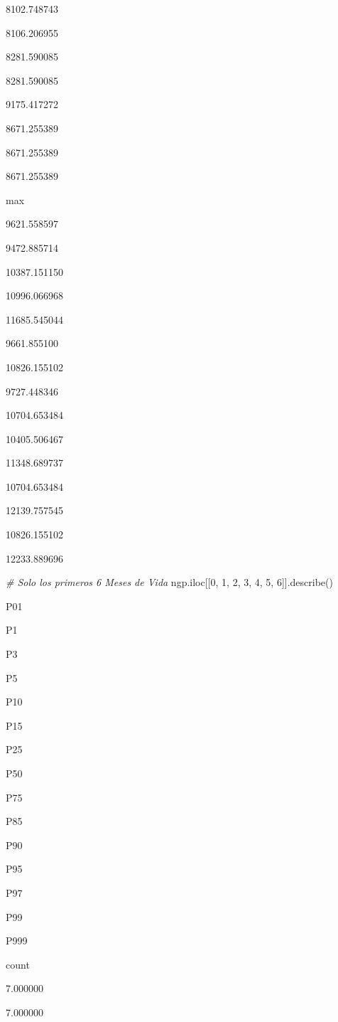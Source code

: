 \documentclass[
]{article}
\newenvironment{Shaded}{\begin{snugshade}}{\end{snugshade}}
\newcommand{\CommentTok}[1]{\textcolor[rgb]{0.56,0.35,0.01}{\textit{#1}}}
\newcommand{\DecValTok}[1]{\textcolor[rgb]{0.00,0.00,0.81}{#1}}
\newcommand{\NormalTok}[1]{#1}
\begin{document}
8102.748743

8106.206955

8281.590085

8281.590085

9175.417272

8671.255389

8671.255389

8671.255389

max

9621.558597

9472.885714

10387.151150

10996.066968

11685.545044

9661.855100

10826.155102

9727.448346

10704.653484

10405.506467

11348.689737

10704.653484

12139.757545

10826.155102

12233.889696

\begin{Shaded}
\begin{Highlighting}[]
\CommentTok{\# Solo los primeros 6 Meses de Vida}
\NormalTok{ngp.iloc[[}\DecValTok{0}\NormalTok{, }\DecValTok{1}\NormalTok{, }\DecValTok{2}\NormalTok{, }\DecValTok{3}\NormalTok{, }\DecValTok{4}\NormalTok{, }\DecValTok{5}\NormalTok{, }\DecValTok{6}\NormalTok{]].describe()}
\end{Highlighting}
\end{Shaded}

P01

P1

P3

P5

P10

P15

P25

P50

P75

P85

P90

P95

P97

P99

P999

count

7.000000

7.000000
\end{document}
